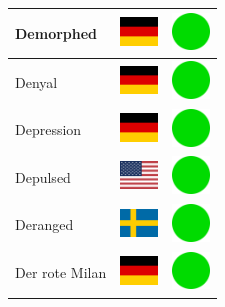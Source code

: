 \documentclass[12pt, a4paper, twoside]{report}
\begin{document}
\begin{center}
\begin{longtable}{|p{5cm}|p{2cm}|p{2cm}|}
 Demorphed                                                  & \includegraphics[width=1cm]{../4x3/de} &   \includegraphics[width=1cm]{../likes/y} \\ \hline
 Denyal                                                     & \includegraphics[width=1cm]{../4x3/de} &   \includegraphics[width=1cm]{../likes/y} \\ \hline
 Depression                                                 & \includegraphics[width=1cm]{../4x3/de} &   \includegraphics[width=1cm]{../likes/y} \\ \hline
 Depulsed                                                   & \includegraphics[width=1cm]{../4x3/us} &   \includegraphics[width=1cm]{../likes/y} \\ \hline
 Deranged                                                   & \includegraphics[width=1cm]{../4x3/se} &   \includegraphics[width=1cm]{../likes/y} \\ \hline
 Der rote Milan                                             & \includegraphics[width=1cm]{../4x3/de} &   \includegraphics[width=1cm]{../likes/y} \\ \hline

\end{longtable}
\end{center}
\end{document}
